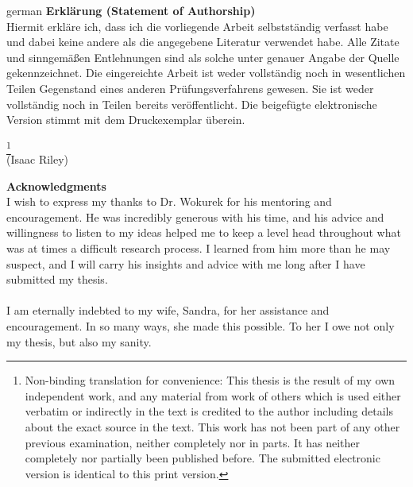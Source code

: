   \newpage
  \thispagestyle{empty}
  \begin{otherlanguage}
  {german}
  \noindent\textbf{Erklärung (Statement of Authorship)}\\
  
  
  \noindent Hiermit erkläre ich, dass ich die vorliegende Arbeit selbstständig verfasst habe und dabei keine andere als die angegebene Literatur verwendet habe. Alle Zitate und sinngemäßen Entlehnungen sind als solche unter genauer Angabe der Quelle gekennzeichnet. Die eingereichte Arbeit ist weder vollständig noch in wesentlichen Teilen Gegenstand eines anderen Prüfungsverfahrens gewesen. Sie ist weder vollständig noch in Teilen bereits veröffentlicht. Die beigefügte elektronische Version stimmt mit dem Druckexemplar überein.%
  \end{otherlanguage}
  \footnote{Non-binding translation for convenience: This thesis is the result of my own independent work, and any material from work of others which is used either verbatim or indirectly in the text is credited to the author including details about the exact source in the text. This work has not been part of any other previous examination, neither completely nor in parts. It has neither completely nor partially been published before. The submitted electronic version is identical to this print version.}\\[2cm]
  \vspace{2cm}
  (Isaac Riley)
  
  \newpage
  \thispagestyle{empty}
  \noindent \textbf{Acknowledgments}\\
  \noindent I wish to express my thanks to Dr. Wokurek for his mentoring and encouragement. 
  He was incredibly generous with his time, and his advice and willingness to listen 
  to my ideas helped me to keep a level head throughout what was at times a difficult 
  research process. I learned from him more than he may suspect, and I will carry his 
  insights and advice with me long after I have submitted my thesis.
\\~\\
  I am eternally indebted to my wife, Sandra, for her assistance and 
  encouragement. 
  In so many ways, she made this possible.
  To her I owe not only my thesis, but also my sanity.
  
  
  \newpage
  {\tableofcontents}
  \newpage